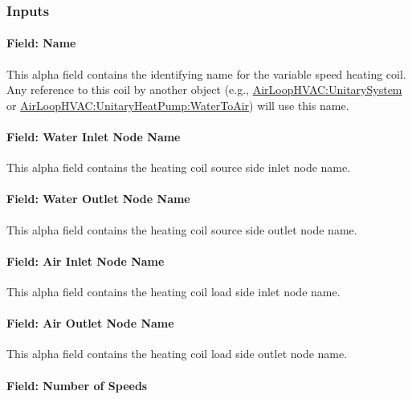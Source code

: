 \subsubsection{Inputs}\label{inputs-34}

\paragraph{Field: Name}\label{field-name-33}

This alpha field contains the identifying name for the variable speed heating coil. Any reference to this coil by another object (e.g., \hyperref[airloophvacunitarysystem]{AirLoopHVAC:UnitarySystem} or \hyperref[airloophvacunitaryheatpumpwatertoair]{AirLoopHVAC:UnitaryHeatPump:WaterToAir}) will use this name.

\paragraph{Field: Water Inlet Node Name}\label{field-water-inlet-node-name-10}

This alpha field contains the heating coil source side inlet node name.

\paragraph{Field: Water Outlet Node Name}\label{field-water-outlet-node-name-10}

This alpha field contains the heating coil source side outlet node name.

\paragraph{Field: Air Inlet Node Name}\label{field-air-inlet-node-name-21}

This alpha field contains the heating coil load side inlet node name.

\paragraph{Field: Air Outlet Node Name}\label{field-air-outlet-node-name-21}

This alpha field contains the heating coil load side outlet node name.

\paragraph{Field: Number of Speeds}\label{field-number-of-speeds-5}

